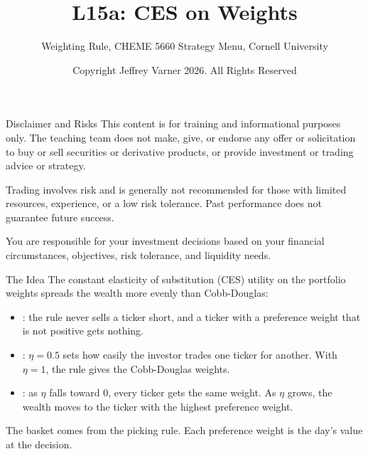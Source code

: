 \documentclass[aspectratio=169,11pt]{beamer}
\title{\texorpdfstring{{\vnheavy L15a}}{L15a}: CES on Weights}
\subtitle{Weighting Rule, CHEME 5660 Strategy Menu, Cornell University}
\author{Copyright Jeffrey Varner 2026. All Rights Reserved}
\begin{document}
\vntitlepage

\begin{frame}{Disclaimer and Risks}
  \vspace{0.6em}
  \textbf{} This content is for training and informational
  purposes only. The teaching team does not make, give, or endorse any offer or
  solicitation to buy or sell securities or derivative products, or provide
  investment or trading advice or strategy.

  \vspace{1.1em}
  \textbf{} Trading involves risk and is generally not recommended for
  those with limited resources, experience, or a low risk tolerance. Past
  performance does not guarantee future success.

  \vspace{1.1em}
  \textbf{} You are responsible for your investment decisions
  based on your financial circumstances, objectives, risk tolerance, and
  liquidity needs.
\end{frame}

\begin{frame}{The Idea}
  \vspace{0.3em}
  The constant elasticity of substitution (CES) utility on the portfolio weights spreads the wealth more
  evenly than Cobb-Douglas:
  \begin{itemize}\setlength{\itemsep}{0.5em}
    \item {}: the rule never sells a ticker short, and a ticker with a preference weight that is not positive gets nothing.
    \item {}: $\eta=0.5$ sets how easily the investor trades one ticker for another. With $\eta=1$, the rule gives the Cobb-Douglas weights.
    \item {}: as $\eta$ falls toward $0$, every ticker gets the same weight. As $\eta$ grows, the wealth moves to the ticker with the highest preference weight.
  \end{itemize}

  \vspace{0.5em}
  The basket comes from the picking rule. Each preference weight is the day's value at the decision.
\end{frame}
\end{document}
